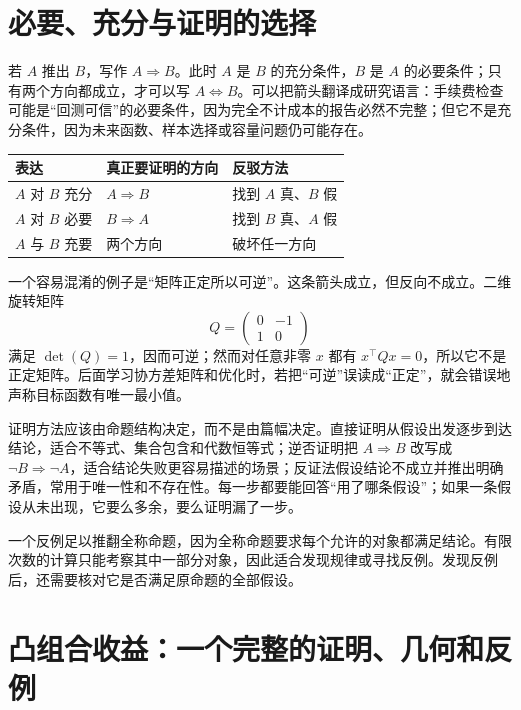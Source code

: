 \section{必要、充分与证明的选择}

若 $A$ 推出 $B$，写作 $A\Rightarrow B$。此时 $A$ 是 $B$ 的充分条件，$B$ 是 $A$ 的必要条件；只有两个方向都成立，才可以写 $A\Leftrightarrow B$。可以把箭头翻译成研究语言：手续费检查可能是“回测可信”的必要条件，因为完全不计成本的报告必然不完整；但它不是充分条件，因为未来函数、样本选择或容量问题仍可能存在。

\begin{center}
\begin{tabular}{lll}
\toprule
表达 & 真正要证明的方向 & 反驳方法 \\
\midrule
$A$ 对 $B$ 充分 & $A\Rightarrow B$ & 找到 $A$ 真、$B$ 假 \\
$A$ 对 $B$ 必要 & $B\Rightarrow A$ & 找到 $B$ 真、$A$ 假 \\
$A$ 与 $B$ 充要 & 两个方向 & 破坏任一方向 \\
\bottomrule
\end{tabular}
\end{center}

一个容易混淆的例子是“矩阵正定所以可逆”。这条箭头成立，但反向不成立。二维旋转矩阵
\[
  Q=\begin{pmatrix}0&-1\\1&0\end{pmatrix}
\]
满足 $\det(Q)=1$，因而可逆；然而对任意非零 $x$ 都有 $x^\top Qx=0$，所以它不是正定矩阵。后面学习协方差矩阵和优化时，若把“可逆”误读成“正定”，就会错误地声称目标函数有唯一最小值。

证明方法应该由命题结构决定，而不是由篇幅决定。直接证明从假设出发逐步到达结论，适合不等式、集合包含和代数恒等式；逆否证明把 $A\Rightarrow B$ 改写成 $\neg B\Rightarrow\neg A$，适合结论失败更容易描述的场景；反证法假设结论不成立并推出明确矛盾，常用于唯一性和不存在性。每一步都要能回答“用了哪条假设”；如果一条假设从未出现，它要么多余，要么证明漏了一步。

一个反例足以推翻全称命题，因为全称命题要求每个允许的对象都满足结论。有限次数的计算只能考察其中一部分对象，因此适合发现规律或寻找反例。发现反例后，还需要核对它是否满足原命题的全部假设。



\section{凸组合收益：一个完整的证明、几何和反例}

